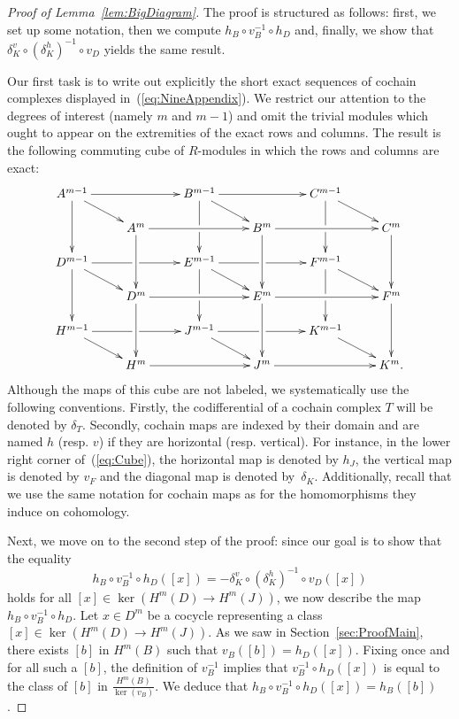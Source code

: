 \documentclass[11pt,a4paper]{amsart}
\theoremstyle{definition}
\begin{document}
\begin{proof}[Proof of Lemma~\ref{lem:BigDiagram}]
The proof is structured as follows: first, we set up some notation, then we compute $h_B \circ v_B^{-1} \circ h_D$ and, finally, we show that $\delta_K^v \circ (\delta_K^h)^{-1}\circ v_D $ yields the same result.

Our first task is to write out explicitly the short exact sequences of cochain complexes displayed in~(\ref{eq:NineAppendix}). We restrict our attention to the degrees of interest (namely $m$ and $m-1$) and omit the trivial modules which ought to appear on the extremities of the exact rows and columns. The result is the following commuting cube of $R$-modules in which the rows and columns are exact:
\begin{equation}
\label{eq:Cube}
 \xymatrix@R0.5cm{
A^{m-1} \ar[rr]\ar[rd] \ar[dd]&& B^{m-1} \ar[rr]\ar[rd] \ar[dd]|\hole&& C^{m-1}\ar[dd]|\hole\ar[rd] & \\
&A^m \ar[rr]\ar[dd] &&  B^m \ar[rr]\ar[dd]&&  C^m\ar[dd]  \\
D^{m-1} \ar[rr]|\hole\ar[rd] \ar[dd] && E^{m-1} \ar[dd]|\hole \ar[rr]|\hole\ar[rd] && F^{m-1}\ar[dd]|\hole \ar[rd]  & \\
&D^m \ar[rr]\ar[dd]&& E^m \ar[rr]\ar[dd]&& F^m\ar[dd]  \\
H^{m-1} \ar[rr]|\hole\ar[rd] && J^{m-1}\ar[rd] \ar[rr]|\hole&& K^{m-1}\ar[rd] & \\
&H^m \ar[rr] && J^m \ar[rr]&& K^m. \\}
\end{equation}
Although the maps of this cube are not labeled, we systematically use the following conventions. Firstly, the codifferential of a cochain complex $T$ will be denoted by $\delta_T$. Secondly, cochain maps are indexed by their domain and are named $h$ (resp. $v$) if they are horizontal (resp. vertical). For instance, in the lower right corner of~(\ref{eq:Cube}), the horizontal map is denoted by $h_J$, the vertical map is denoted by $v_F$ and the diagonal map is denoted by~$\delta_K$. Additionally, recall that we use the same notation for cochain maps as for the homomorphisms they induce on cohomology.

Next, we move on to the second step of the proof: since our goal is to show that the equality
$$ h_B \circ v_B^{-1} \circ h_D([x])=- \delta_K^v \circ (\delta_K^h)^{-1}\circ v_D([x])$$
holds for all $[x] \in \ker(H^m(D) \to H^m(J))$, we now describe the map $h_B \circ v_B^{-1} \circ h_D$. Let $x \in D^m$ be a cocycle representing a class $[x] \in \ker(H^m(D) \to H^m(J))$. As we saw in Section~\ref{sec:ProofMain}, there exists $[b]$ in $H^m(B)$ such that $v_B([b])=h_D([x])$. Fixing once and for all such a $[b]$, the definition of $v_B^{-1}$ implies that $v_B^{-1} \circ h_D([x])$ is equal to the class of $[b]$ in $\frac{H^m(B)}{\ker(v_B)}$. We deduce that $h_B \circ v_B^{-1} \circ h_D([x])=h_B([b])$. 


\end{proof}
\end{document}
